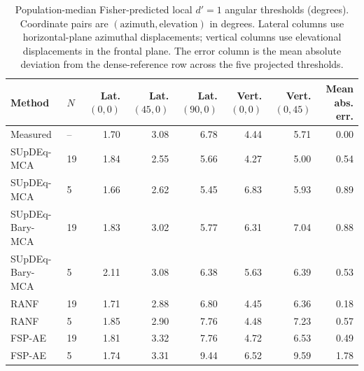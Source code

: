 \begin{table}[ht!]
\centering
\caption{Population-median Fisher-predicted local $d'=1$ angular thresholds (degrees). Coordinate pairs are $(\mathrm{azimuth},\mathrm{elevation})$ in degrees. Lateral columns use horizontal-plane azimuthal displacements; vertical columns use elevational displacements in the frontal plane. The error column is the mean absolute deviation from the dense-reference row across the five projected thresholds.}
\label{tab:local_threshold_plausibility}
\scriptsize
\setlength{\tabcolsep}{5pt}
\begin{tabular}{llrrrrrr}
\toprule
Method & $N$ & Lat. $(0,0)$ & Lat. $(45,0)$ & Lat. $(90,0)$ & Vert. $(0,0)$ & Vert. $(0,45)$ & Mean abs. err. \\
\midrule
Measured & -- & 1.70 & 3.08 & 6.78 & 4.44 & 5.71 & 0.00 \\
SUpDEq-MCA & 19 & 1.84 & 2.55 & 5.66 & 4.27 & 5.00 & 0.54 \\
SUpDEq-MCA & 5 & 1.66 & 2.62 & 5.45 & 6.83 & 5.93 & 0.89 \\
SUpDEq-Bary-MCA & 19 & 1.83 & 3.02 & 5.77 & 6.31 & 7.04 & 0.88 \\
SUpDEq-Bary-MCA & 5 & 2.11 & 3.08 & 6.38 & 5.63 & 6.39 & 0.53 \\
RANF & 19 & 1.71 & 2.88 & 6.80 & 4.45 & 6.36 & 0.18 \\
RANF & 5 & 1.85 & 2.90 & 7.76 & 4.48 & 7.23 & 0.57 \\
FSP-AE & 19 & 1.81 & 3.32 & 7.76 & 4.72 & 6.53 & 0.49 \\
FSP-AE & 5 & 1.74 & 3.31 & 9.44 & 6.52 & 9.59 & 1.78 \\
\bottomrule
\end{tabular}
\end{table}
